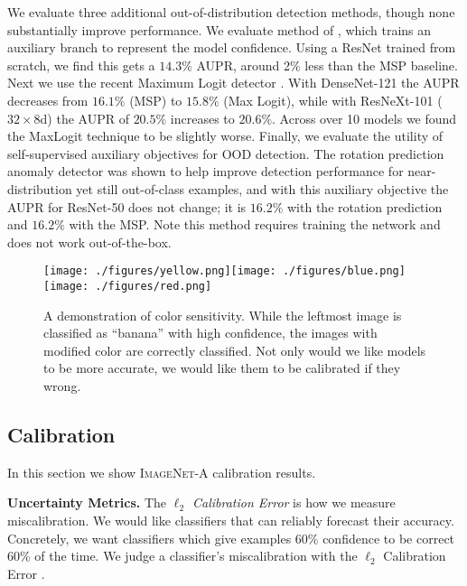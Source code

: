 \documentclass[10pt,twocolumn,letterpaper]{article}
\begin{document}
We evaluate three additional out-of-distribution detection methods, though none substantially improve performance. We evaluate method of \cite{Devries2018LearningCF}, which trains an auxiliary branch to represent the model confidence. Using a ResNet trained from scratch, we find this gets a $14.3\%$ AUPR, around 2\% less than the MSP baseline. Next we use the recent Maximum Logit detector \cite{Hendrycks2020ScalingOD}. With 
DenseNet-121 the AUPR decreases from $16.1\%$ (MSP) to $15.8\%$ (Max Logit), while with ResNeXt-101 ($32\times8$d) the AUPR of $20.5\%$ increases to $20.6\%$. Across over 10 models we found the MaxLogit technique to be slightly worse. Finally, we evaluate the utility of self-supervised auxiliary objectives for OOD detection. The rotation prediction anomaly detector \cite{Hendrycks2019UsingSL} was shown to help improve detection performance for near-distribution yet still out-of-class examples, and with this auxiliary objective the AUPR for ResNet-50 does not change; it is $16.2\%$ with the rotation prediction and $16.2\%$ with the MSP. Note this method requires training the network and does not work out-of-the-box. 

\begin{figure}[]
\centering
	\texttt{[image: ./figures/yellow.png]}\texttt{[image: ./figures/blue.png]}\texttt{[image: ./figures/red.png]}
	\caption{A demonstration of color sensitivity. While the leftmost image is classified as ``banana'' with high confidence, the images with modified color are correctly classified. Not only would we like models to be more accurate, we would like them to be calibrated if they wrong.}\label{fig:dragonfly}
\end{figure}

\subsection{Calibration}\label{app:calibration}
In this section we show \textsc{ImageNet-A} calibration results.




\noindent\textbf{Uncertainty Metrics.} \quad The \textit{$\ell_2$ Calibration Error} is how we measure miscalibration. We would like classifiers that can reliably forecast their accuracy. Concretely, we want classifiers which give examples 60\% confidence to be correct 60\% of the time. We judge a classifier's miscalibration with the $\ell_2$ Calibration Error \cite{kumar2019calibration}.
\end{document}
